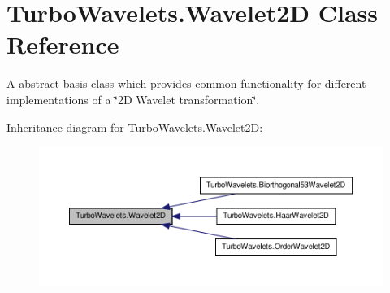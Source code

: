 \hypertarget{class_turbo_wavelets_1_1_wavelet2_d}{\section{\-Turbo\-Wavelets.\-Wavelet2\-D \-Class \-Reference}
\label{class_turbo_wavelets_1_1_wavelet2_d}
}


\-A abstract basis class which provides common functionality for different implementations of a \char`\"{}2\-D Wavelet transformation\char`\"{}.  




\-Inheritance diagram for \-Turbo\-Wavelets.\-Wavelet2\-D\-:
\nopagebreak
\begin{figure}[H]
\begin{center}
\leavevmode
\includegraphics[width=350pt]{class_turbo_wavelets_1_1_wavelet2_d__inherit__graph}
\end{center}
\end{figure}
